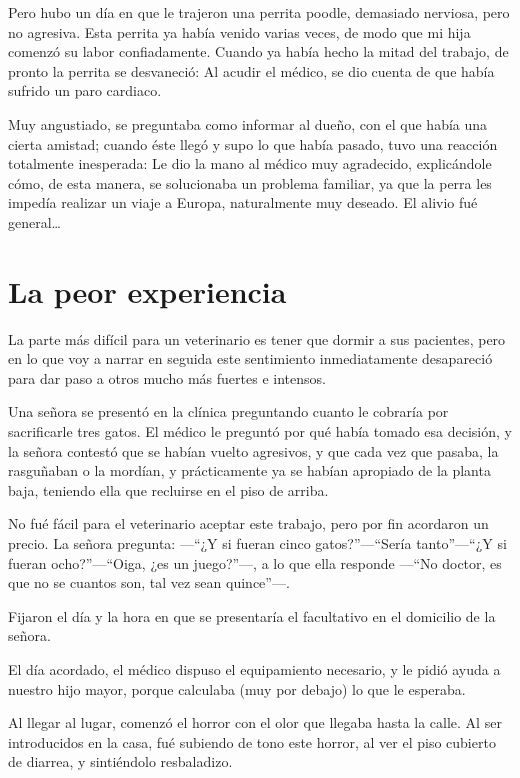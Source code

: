 \documentclass[letterpaper, 12pt]{book}
\begin{document}
Pero hubo un día en que le trajeron una perrita poodle, demasiado nerviosa, pero no agresiva. Esta perrita ya había venido varias veces, de modo que mi hija comenzó su labor confiadamente. Cuando ya había hecho la mitad del trabajo, de pronto la perrita se desvaneció: Al acudir el médico, se dio cuenta de que había sufrido un paro cardiaco. 

Muy angustiado, se preguntaba como informar al dueño, con el que había una cierta amistad; cuando éste llegó y supo lo que había pasado, tuvo una reacción totalmente inesperada: Le dio la mano al médico muy agradecido, explicándole cómo, de esta manera, se solucionaba un problema familiar, ya que la perra les impedía realizar un viaje a Europa, naturalmente muy deseado. El alivio fué general\ldots

\chapter{La peor experiencia}

La parte más difícil para un veterinario es tener que dormir a sus pacientes, pero en lo que voy a narrar en seguida este sentimiento inmediatamente desapareció para dar paso a otros mucho más fuertes e intensos.

Una señora se presentó en la clínica preguntando cuanto le cobraría por sacrificarle tres gatos. El médico le preguntó por qué había tomado esa decisión, y la señora contestó que se habían vuelto agresivos, y que cada vez que pasaba, la rasguñaban o la mordían, y prácticamente ya se habían apropiado de la planta baja, teniendo ella que recluirse en el piso de arriba.

No fué fácil para el veterinario aceptar este trabajo, pero por fin acordaron un precio. La señora pregunta: ---``¿Y si fueran cinco gatos?''---``Sería tanto''---``¿Y si fueran ocho?''---``Oiga, ¿es un juego?''---, a lo que ella responde ---``No doctor, es que no se cuantos son, tal vez sean quince''---. 

Fijaron el día y la hora en que se presentaría el facultativo en el domicilio de la señora.

El día acordado, el médico dispuso el equipamiento necesario, y le pidió ayuda a nuestro hijo mayor, porque calculaba (muy por debajo) lo que le esperaba. 

Al llegar al lugar, comenzó el horror con el olor que llegaba hasta la calle. Al ser introducidos en la casa, fué subiendo de tono este horror, al ver el piso cubierto de diarrea, y sintiéndolo resbaladizo.
\end{document}
